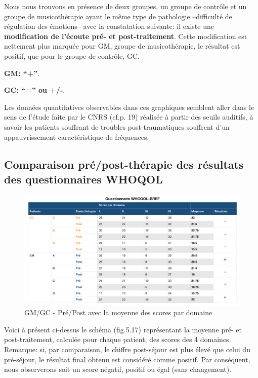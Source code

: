             Nous nous trouvons
           en présence de deux groupes, un groupe de contrôle et un
           groupe de musicothérapie ayant le même type de
           pathologie --difficulté de régulation des émotions-- avec la constatation suivante: il existe 
          une \textbf{modification de l'écoute pré- et post-traitement}.
          Cette modification est nettement plus marquée
          pour GM, groupe de musicothérapie, le résultat est positif, que pour le groupe de contrôle, GC.

          \textbf{GM: ``+''}.

          
          \textbf{GC:  ``='' ou +/-}.

          
        Les données quantitatives observables dans ces graphiques semblent aller dans le
sens de  l'étude faite par le
CNRS (cf.p. 19) réalisée à partir des seuils auditifs, à savoir
les patients souffrant de troubles post-traumatiques souffrent d'un
appauvrissement caractéristique de fréquences.


\subsection{ Comparaison pré/post-thérapie des résultats des
  questionnaires WHOQOL}

\begin{figure}[tbh]
\centering
\includegraphics[width=1.2\linewidth]{images/graphiques/questionnaire_wq.png}
\caption[Questionnaire WHOQOL-BREF]{GM/GC - Pré/Post avec la moyenne des scores par domaine}
       
\label{groupecontroleimage1}
\end{figure}
Voici à présent ci-dessus le schéma (fig.5.17) représentant la
moyenne pré- et post-traitement, calculée pour chaque patient, des scores
des 4 domaines.
Remarque: si, par comparaison, le chiffre post-séjour est plus élevé
que celui du
pré-séjour, le résultat final obtenu est considéré comme
positif. Par conséquent, nous
observerons soit un score négatif, positif ou égal (sans changement).


